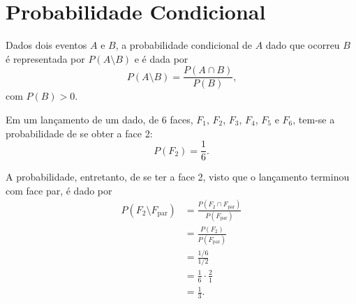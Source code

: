\documentclass[11pt,fleqn]{book}
\numberwithin{mpicture}{chapter}
\numberwithin{mtable}{chapter}
\numberwithin{mframe}{chapter}
\begin{document}
\section{Probabilidade Condicional}

Dados dois eventos $A$ e $B$, a probabilidade condicional de $A$ dado que ocorreu $B$ é representada por $P(A\setminus B)$ e é dada por
\begin{equation}
	P(A\setminus B)=\frac{P(A\cap B)}{P(B)}\text{,}
\end{equation}
com $P(B)>0$.

\begin{example}
	Em um lançamento de um dado, de 6 faces, $F_1$, $F_2$, $F_3$, $F_4$, $F_5$ e $F_6$, tem-se a probabilidade de se obter a face 2:
	\[
		P(F_2)=\frac{1}{6}\text{.}
	\]
	
	A probabilidade, entretanto, de se ter a face 2, visto que o lançamento terminou com face par, é dado por
	\begin{align*}
		P(F_2\setminus F_{\text{par}})&=\frac{P(F_2 \cap F_{\text{par}})}{P(F_{\text{par}})}\\
									   &=\frac{P(F_2)}{P(F_{\text{par}})}\\
									   &=\frac{1/6}{1/2}\\
									   &=\frac{1}{6}\cdot \frac{2}{1}\\
									   &=\frac{1}{3}\text{.}
	\end{align*}
\end{example}

\newpage
\end{document}
